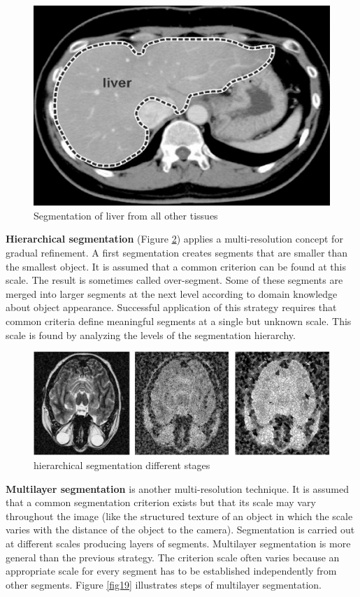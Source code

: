 \begin{figure}[htbp]
	\centering \includegraphics[width=0.6\columnwidth]{./figures/Fig17.jpg}
	\caption{Segmentation of liver from all other tissues}
	\label{fig17}
\end{figure}

\textbf{Hierarchical segmentation} (Figure \ref{fig18}) applies a multi-resolution concept for gradual refinement. A first segmentation creates segments that are smaller than the smallest object. It is assumed that a common criterion can be found at this scale. The result is sometimes called over-segment. Some of these segments are merged into larger segments at the next level according to domain knowledge about object appearance. Successful application of this strategy requires that common criteria define meaningful segments at a single but unknown scale. This scale is found by analyzing the levels of the segmentation hierarchy.


\begin{figure}[htbp]
	\centering \includegraphics[width=0.55\columnwidth]{./figures/Fig18.png}
	\caption{hierarchical segmentation different stages}
	\label{fig18}
\end{figure}

\textbf{Multilayer segmentation} is another multi-resolution technique. It is assumed that a common segmentation criterion exists but that its scale may vary throughout the image (like the structured texture of an object in which the scale varies with the distance of the object to the camera). Segmentation is carried out at different scales producing layers of segments. Multilayer segmentation is more general than the previous strategy. The criterion scale often varies because an appropriate scale for every segment has to be established independently from other segments. Figure \ref{fig19} illustrates steps of multilayer segmentation. 

